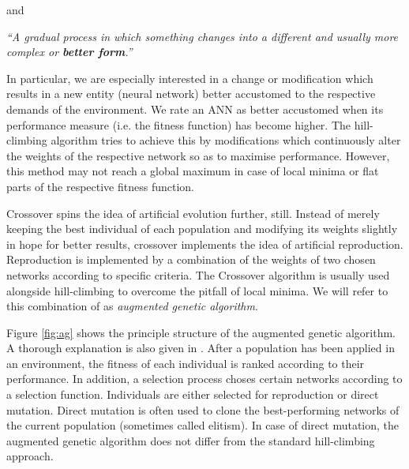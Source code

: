 \documentclass[10pt,a4paper,DIV=11]{scrreprt}
\begin{document}
and

\begin{center}
\textit{“A gradual process in which something changes into a different and usually more complex or \textbf{better form}.”}\\ 
\end{center}

In particular, we are especially interested in a change or modification which results in a new entity (neural network) better accustomed to the 
respective demands of the environment. We rate an ANN as better accustomed when its performance measure (i.e. the fitness function) has become 
higher. The hill-climbing algorithm tries to achieve this by modifications which continuously alter the weights of the respective network so 
as to maximise performance. However, this method may not reach a global maximum in case of local minima or flat parts of the respective fitness 
function.

Crossover spins the idea of artificial evolution further, still. Instead of merely keeping the best individual of each population and modifying 
its weights slightly in hope for better results, crossover implements the idea of artificial reproduction. Reproduction is implemented by a 
combination of the weights of two chosen networks according to specific criteria. The Crossover algorithm is usually used alongside hill-climbing 
to overcome the pitfall of local minima. We will refer to this combination of as \textit{augmented genetic algorithm}.

Figure \ref{fig:ag} shows the principle structure of the augmented genetic algorithm. A thorough explanation is also given in \cite{CROSSOVER}.
After a population has been applied in an environment, the fitness of each individual is ranked according to their performance.  
In addition, a selection process choses certain networks according to a selection function. Individuals are either selected for reproduction 
or direct mutation. Direct mutation is often used to clone the best-performing networks of the current population (sometimes called elitism). 
In case of direct mutation, the augmented genetic algorithm does not differ from the standard hill-climbing approach.
\end{document}
